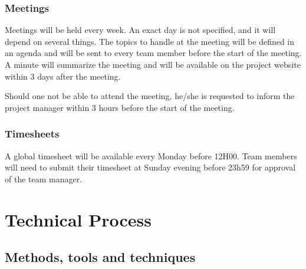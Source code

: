 \documentclass[a4paper, 12pt]{report}
\begin{document}
			\subsection{Meetings}
			Meetings will be held every week. An exact day is not specified, and it will
			depend on several things. The topics to handle at the meeting will be defined
			in an agenda and will be sent to every team member before the start of the
			meeting. A minute will summarize the meeting and will be available on the project 
			website within 3 days after the meeting.
			
			Should one not be able to attend the meeting, he/she is requested to inform
			the project manager within 3 hours before the start of the meeting.
			
			\subsection{Timesheets}
			A global timesheet will be available every Monday before 12H00. Team 
			members will need to submit their timesheet at Sunday evening before 23h59
			for approval of the team manager.
			
	\chapter{Technical Process}
	
			\section{Methods, tools and techniques}
			
\end{document}
